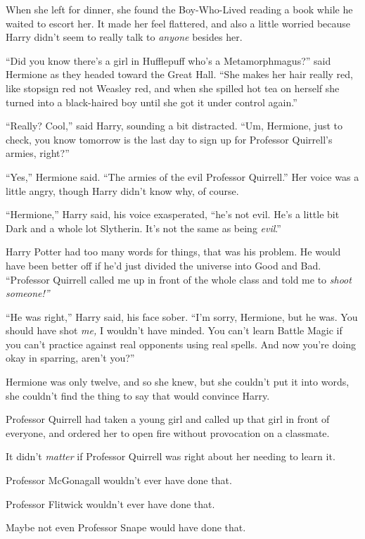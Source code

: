 When she left for dinner, she found the Boy-Who-Lived reading a book
while he waited to escort her. It made her feel flattered, and also a
little worried because Harry didn't seem to really talk to \emph{anyone}
besides her.

``Did you know there's a girl in Hufflepuff who's a Metamorphmagus?''
said Hermione as they headed toward the Great Hall. ``She makes her hair
really red, like stopsign red not Weasley red, and when she spilled hot
tea on herself she turned into a black-haired boy until she got it under
control again.''

``Really? Cool,'' said Harry, sounding a bit distracted. ``Um, Hermione,
just to check, you know tomorrow is the last day to sign up for
Professor Quirrell's armies, right?''

``Yes,'' Hermione said. ``The armies of the evil Professor Quirrell.''
Her voice was a little angry, though Harry didn't know why, of course.

``Hermione,'' Harry said, his voice exasperated, ``he's not evil. He's a
little bit Dark and a whole lot Slytherin. It's not the same as being
\emph{evil}.''

Harry Potter had too many words for things, that was his problem. He
would have been better off if he'd just divided the universe into Good
and Bad. ``Professor Quirrell called me up in front of the whole class
and told me to \emph{shoot someone!''}

``He was right,'' Harry said, his face sober. ``I'm sorry, Hermione, but
he was. You should have shot \emph{me,} I wouldn't have minded. You
can't learn Battle Magic if you can't practice against real opponents
using real spells. And now you're doing okay in sparring, aren't you?''

Hermione was only twelve, and so she knew, but she couldn't put it into
words, she couldn't find the thing to say that would convince Harry.

Professor Quirrell had taken a young girl and called up that girl in
front of everyone, and ordered her to open fire without provocation on a
classmate.

It didn't \emph{matter} if Professor Quirrell was right about her
needing to learn it.

Professor McGonagall wouldn't ever have done that.

Professor Flitwick wouldn't ever have done that.

Maybe not even Professor Snape would have done that.

